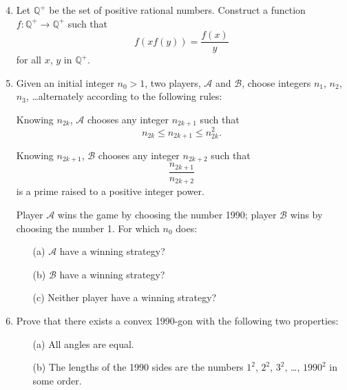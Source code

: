 \documentclass[12pt]{article}
\begin{document}
\begin{enumerate}
\setcounter{enumi}{3}
\item
Let ${\mathbb Q}^+$ be the set of positive rational numbers.  Construct a
function $f : {\mathbb Q}^+ \rightarrow {\mathbb Q}^+$ such that
$$f(xf(y)) = \frac{f(x)}{y}$$
for all $x$, $y$ in ${\mathbb Q}^+$.

\item
Given an initial integer $n_0 > 1$, two players, ${\mathcal A}$ and ${\mathcal
B}$, choose integers $n_1$, $n_2$, $n_3$, \ldots alternately according to the
following rules:

Knowing $n_{2k}$, ${\mathcal A}$ chooses any integer $n_{2k+1}$ such that
$$n_{2k} \leq n_{2k+1} \leq n_{2k}^2.$$

Knowing $n_{2k+1}$, ${\mathcal B}$ chooses any integer $n_{2k+2}$ such that
$$\frac{n_{2k+1}}{n_{2k+2}}$$
is a prime raised to a positive integer power.

Player ${\mathcal A}$ wins the game by choosing the number 1990; player
${\mathcal B}$ wins by choosing the number 1.  For which $n_0$ does:
  \begin{enumerate}
  \item[(a)] ${\mathcal A}$ have a winning strategy?
  \item[(b)] ${\mathcal B}$ have a winning strategy?
  \item[(c)] Neither player have a winning strategy?
  \end{enumerate}

\item
Prove that there exists a convex 1990-gon with the following two properties:
  \begin{enumerate}
  \item[(a)] All angles are equal.
  \item[(b)] The lengths of the 1990 sides are the numbers $1^2$, $2^2$, $3^2$,
  \ldots, $1990^2$ in some order.
  \end{enumerate}
\end{enumerate}
\end{document}
